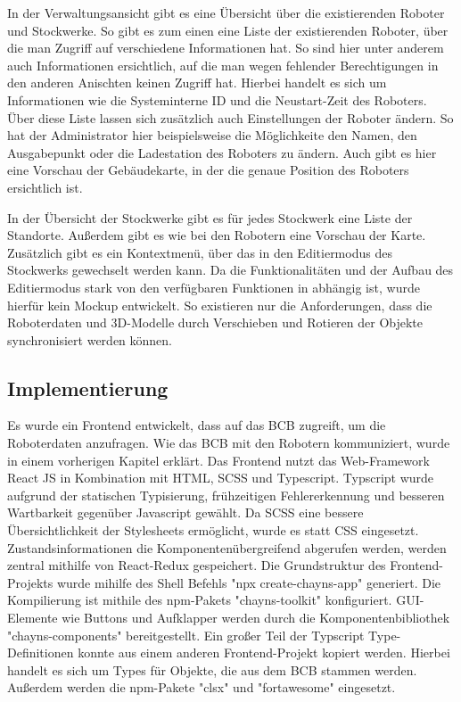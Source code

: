In der Verwaltungsansicht gibt es eine Übersicht über die existierenden Roboter und Stockwerke. So gibt es zum einen eine Liste der existierenden Roboter, über die man Zugriff auf verschiedene Informationen hat. So sind hier unter anderem auch Informationen ersichtlich, auf die man wegen fehlender Berechtigungen in den anderen Anischten keinen Zugriff hat. Hierbei handelt es sich um Informationen wie die Systeminterne \ac{ID} und die Neustart-Zeit des Roboters. Über diese Liste lassen sich zusätzlich auch Einstellungen der Roboter ändern. So hat der Administrator hier beispielsweise die Möglichkeite den Namen, den Ausgabepunkt oder die Ladestation des Roboters zu ändern. Auch gibt es hier eine Vorschau der Gebäudekarte, in der die genaue Position des Roboters ersichtlich ist.

In der Übersicht der Stockwerke gibt es für jedes Stockwerk eine Liste der Standorte. Außerdem gibt es wie bei den Robotern eine Vorschau der Karte. Zusätzlich gibt es ein Kontextmenü, über das in den Editiermodus des Stockwerks gewechselt werden kann. Da die Funktionalitäten und der Aufbau des Editiermodus stark von den verfügbaren Funktionen in \deckgl{} abhängig ist, wurde hierfür kein Mockup entwickelt. So existieren nur die Anforderungen, dass die Roboterdaten und 3D-Modelle durch Verschieben und Rotieren der Objekte synchronisiert werden können.  

\subsection{Implementierung}
Es wurde ein Frontend entwickelt, dass auf das \ac{BCB} zugreift, um die Roboterdaten anzufragen. Wie das \ac{BCB} mit den Robotern kommuniziert, wurde in einem vorherigen Kapitel erklärt. %
Das Frontend nutzt das Web-Framework React JS in Kombination mit HTML, SCSS und Typescript. Typscript wurde aufgrund der statischen Typisierung, frühzeitigen Fehlererkennung und besseren Wartbarkeit gegenüber Javascript gewählt. Da SCSS eine bessere Übersichtlichkeit der Stylesheets ermöglicht, wurde es statt CSS eingesetzt. Zustandsinformationen die Komponentenübergreifend abgerufen werden, werden zentral mithilfe von React-Redux gespeichert. Die Grundstruktur des Frontend-Projekts wurde mihilfe des Shell Befehls "npx create-chayns-app" generiert. Die Kompilierung ist mithile des npm-Pakets "chayns-toolkit" konfiguriert. GUI-Elemente wie Buttons und Aufklapper werden durch die Komponentenbibliothek "chayns-components" bereitgestellt. Ein großer Teil der Typscript Type-Definitionen konnte aus einem anderen Frontend-Projekt kopiert werden. Hierbei handelt es sich um Types für Objekte, die aus dem \ac{BCB} stammen werden. Außerdem werden die npm-Pakete "clsx" und "fortawesome" eingesetzt.

